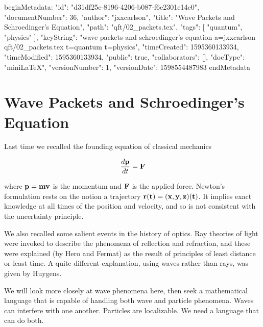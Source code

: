 beginMetadata:
{
    "id": "d31df25c-8196-4206-b087-f6e2301e14e0",
    "documentNumber": 36,
    "author": "jxxcarlson",
    "title": "Wave Packets and Schroedinger's Equation",
    "path": "qft/02_packets.tex",
    "tags": [
        "quantum",
        "physics"
    ],
    "keyString": "wave packets and schroedinger's equation a=jxxcarlson qft/02_packets.tex t=quantum t=physics",
    "timeCreated": 1595360133934,
    "timeModified": 1595360133934,
    "public": true,
    "collaborators": [],
    "docType": "miniLaTeX",
    "versionNumber": 1,
    "versionDate": 1598554487983
}
endMetadata

\begin{mathmacro}
\newcommand{\bop}[0]{\bf{p}}
\newcommand{\boF}[0]{\bf{F}}
\newcommand{\bor}[0]{\bf{r}}
\newcommand{\bov}[0]{\bf{v}}
\end{mathmacro}

\setcounter{section}{3}


\section{Wave Packets and Schroedinger's Equation}




Last time we recalled the founding equation of classical mechanics

\begin{equation}
\frac{d \bf{p} }{dt} = \boF
\end{equation}

where $\bop = m\bov $ is the momentum and $\boF $  is the applied force.  Newton's formulation rests on the notion a trajectory $\bor(t) = (x,y,z)(t)$.  It implies exact knowledge at all times of the position and velocity, and so is not consistent with the uncertainty principle.

We also recalled some salient events in the history of optics. Ray theories of light were invoked to describe the phenomena of reflection and refraction, and these were explained (by Hero and Fermat) as the result of principles of least distance or least time.  A quite different explanation, using waves rather than rays, was given by Huygens. 

We will look more closely at wave phenomena here, then seek a mathematical language that is capable of handling both wave and particle phenomena.  Waves can interfere with one another.  Particles are localizable. We need a language that can do both.

